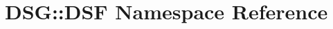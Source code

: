 \hypertarget{namespaceDSG_1_1DSF}{\section{D\+S\+G\+:\+:D\+S\+F Namespace Reference}
\label{namespaceDSG_1_1DSF}
}
